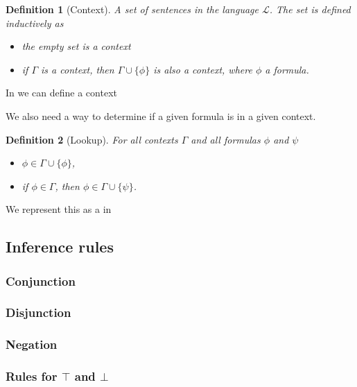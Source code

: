 \documentclass[titlepage]{article}
\newtheorem{definition}{Definition}[section]
\begin{document}
\begin{definition}[Context]
    A set of sentences in the language $\mathcal{L}$. The set is defined inductively as
    \begin{itemize}
        \item the empty set is a context
        \item if $\Gamma$ is a context, then $\Gamma \cup \{\phi\}$ is also a context, where $\phi$ a formula.
    \end{itemize}
\end{definition}

In \Agda we can define a context \Type


We also need a way to determine if a given formula is in a given context. 
\begin{definition}[Lookup]
    For all contexts $\Gamma$ and all formulas $\phi$ and $\psi$
    \begin{itemize}
        \item $\phi \in \Gamma \cup \{\phi\}$,
        \item if $\phi \in \Gamma$, then $\phi \in \Gamma \cup \{\psi\}$.
    \end{itemize}
\end{definition}

We represent this as a \Type in \Agda




\subsection{Inference rules}

\subsubsection{Conjunction}
\subsubsection{Disjunction}
\subsubsection{Negation}
\subsubsection{Rules for $\top$ and $\bot$}
\end{document}
